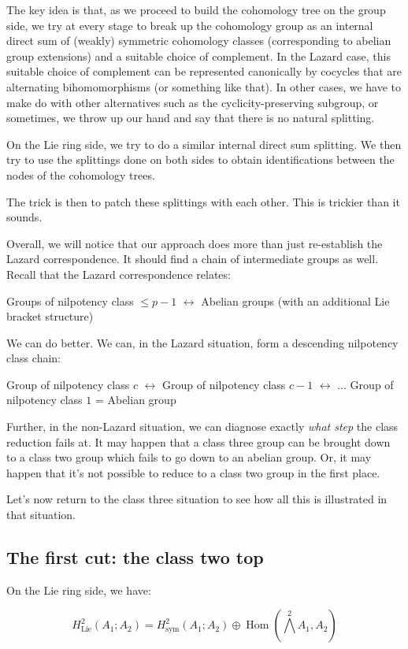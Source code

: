 \documentclass[10pt]{amsart}
\begin{document}
The key idea is that, as we proceed to build the cohomology tree on
the group side, we try at every stage to break up the cohomology group
as an internal direct sum of (weakly) symmetric cohomology classes
(corresponding to abelian group extensions) and a suitable choice of
complement. In the Lazard case, this suitable choice of complement can
be represented canonically by cocycles that are alternating
bihomomorphisms (or something like that). In other cases, we have to
make do with other alternatives such as the cyclicity-preserving
subgroup, or sometimes, we throw up our hand and say that there is no
natural splitting.

On the Lie ring side, we try to do a similar internal direct sum
splitting. We then try to use the splittings done on both sides to
obtain identifications between the nodes of the cohomology trees.

The trick is then to patch these splittings with each other. This is
trickier than it sounds.

Overall, we will notice that our approach does more than just
re-establish the Lazard correspondence. It should find a chain of
intermediate groups as well. Recall that the Lazard correspondence relates:

Groups of nilpotency class $\le p - 1$ $\leftrightarrow$ Abelian groups (with an additional Lie bracket structure)

We can do better. We can, in the Lazard situation, form a descending
nilpotency class chain:

Group of nilpotency class $c$ $\leftrightarrow$ Group of nilpotency class $c - 1$ $\leftrightarrow$ $\dots$ Group of nilpotency class $1$ = Abelian group

Further, in the non-Lazard situation, we can diagnose exactly {\em
what step} the class reduction fails at. It may happen that a class
three group can be brought down to a class two group which fails to go
down to an abelian group. Or, it may happen that it's not possible to
reduce to a class two group in the first place.

Let's now return to the class three situation to see how all this is
illustrated in that situation.

\subsection{The first cut: the class two top}

On the Lie ring side, we have:

$$H^2_{\text{Lie}}(A_1;A_2) = H^2_{\text{sym}}(A_1;A_2) \oplus \operatorname{Hom}(\bigwedge^2A_1,A_2)$$
\end{document}
